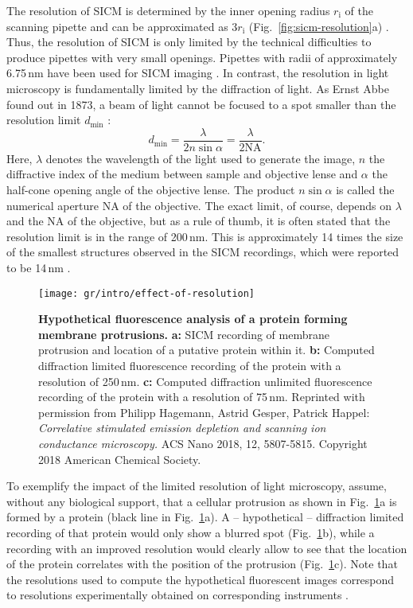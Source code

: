 The resolution of SICM is determined by the inner opening radius
$r_\mathrm{i}$ of the scanning pipette and can be approximated as
$3r_\mathrm{i}$ (Fig.~\ref{fig:sicm-resolution}a)
\cite{rheinlaender:094905,Rheinlaender2015}. Thus, the resolution of SICM is
only limited by the technical difficulties to produce pipettes with very small
openings. Pipettes with radii of approximately 6.75\,nm have been used for
SICM imaging \cite{Shevchuk2006}. In
contrast, the resolution in light microscopy is fundamentally limited by the
diffraction of light. As Ernst Abbe found out in 1873, a beam of light cannot
be focused to a spot smaller than the resolution limit $d_\text{min}$
\cite{Abbe1873}:
\begin{equation}
  d_\text{min} = \frac\lambda{2n\sin\alpha} = \frac\lambda{2\mathrm{NA}}\text{.}
  \label{eq:diffraction-limit}
\end{equation}
Here, $\lambda$ denotes the wavelength of the light used to generate the
image, $n$ the diffractive index of the medium between sample and objective
lense and $\alpha$ the half-cone opening angle of the objective lense. The
product $n\sin\alpha$ is called the numerical aperture $\mathrm{NA}$ of the
objective. The exact limit, of course, depends on $\lambda$ and the NA of the
objective, but as a rule of thumb, it is often stated that the resolution
limit is in the range of 200\,nm. This is approximately 14 times the size of
the smallest structures observed in the SICM recordings, which were reported to be 14\,nm
\cite{Shevchuk2006}.

\begin{figure}
  \centering
  \texttt{[image: gr/intro/effect-of-resolution]}%
  \caption{\textbf{Hypothetical fluorescence analysis of a protein forming
      membrane protrusions.} \textbf{a:} SICM recording of membrane protrusion
    and location of a putative protein within it. \textbf{b:} Computed
    diffraction limited fluorescence recording of the protein with a
    resolution of 250\,nm. \textbf{c:} Computed diffraction unlimited
    fluorescence recording of the protein with a resolution of 75\,nm.
    Reprinted with permission from Philipp Hagemann, Astrid Gesper, Patrick
    Happel: \emph{Correlative stimulated emission depletion and scanning ion
      conductance microscopy.} ACS Nano 2018, 12, 5807-5815. Copyright 2018
    American Chemical Society.}
  \label{fig:sicm-and-light-resolution}
\end{figure}

To exemplify the impact of the limited resolution of light microscopy, assume,
without any biological support, that a cellular protrusion as shown in
Fig.~\ref{fig:sicm-and-light-resolution}a is formed by a protein (black line
in Fig.~\ref{fig:sicm-and-light-resolution}a). A -- hypothetical --
diffraction limited recording of that protein would only show a blurred spot
(Fig.~\ref{fig:sicm-and-light-resolution}b), while a recording with an
improved resolution would clearly allow to see that the location of the
protein correlates with the position of the protrusion
(Fig.~\ref{fig:sicm-and-light-resolution}c). Note that the resolutions used to
compute the hypothetical fluorescent images correspond to resolutions
experimentally obtained on corresponding instruments \cite{Hagemann2018}. 

